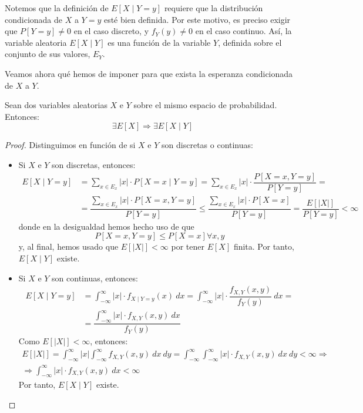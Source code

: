 Notemos que la definición de $E[X\mid Y = y]$ requiere que la distribución condicionada de $X$ a $Y = y$ esté bien definida. Por este motivo, es preciso exigir que $P[Y = y] \neq 0$ en el caso discreto, y $f_Y(y) \neq 0$ en el caso continuo. Así, la variable aleatoria $E[X\mid Y]$ es una función de la variable $Y$, definida sobre el conjunto de sus valores, $E_Y$.

Veamos ahora qué hemos de imponer para que exista la esperanza condicionada de $X$ a $Y$.
\begin{prop}
    Sean dos variables aleatorias $X$ e $Y$ sobre el mismo espacio de probabilidad. Entonces:
    \begin{equation*}
        \exists E[X] \Longrightarrow \exists E[X\mid Y]
    \end{equation*}
\end{prop}
\begin{proof}
    Distinguimos en función de si $X$ e $Y$ son discretas o continuas:
    \begin{itemize}
        \item Si $X$ e $Y$ son discretas, entonces:
        \begin{align*}
            E[X\mid Y=y] &= \sum_{x\in E_x} |x|\cdot P[X = x\mid Y = y] = \sum_{x\in E_x} |x|\cdot \dfrac{P[X = x, Y = y]}{P[Y = y]} =\\&= \dfrac{\sum_{x\in E_x} |x|\cdot P[X = x, Y = y]}{P[Y = y]} \leq \dfrac{\sum_{x\in E_x} |x|\cdot P[X = x]}{P[Y = y]} = \dfrac{E[|X|]}{P[Y = y]}<\infty
        \end{align*}
        donde en la desigualdad hemos hecho uso de que
        \begin{equation*}
            P[X = x, Y = y] \leq P[X = x] \forall x,y
        \end{equation*}
        y, al final, hemos usado que $E[|X|]<\infty$ por tener $E[X]$ finita. Por tanto, $E[X\mid Y]$ existe.

        \item Si $X$ e $Y$ son continuas, entonces:
        \begin{align*}
            E[X\mid Y=y] &= \int_{-\infty}^{\infty} |x|\cdot f_{X\mid Y=y}(x)~dx = \int_{-\infty}^{\infty} |x|\cdot \dfrac{f_{X,Y}(x,y)}{f_Y(y)}~dx =\\&= \dfrac{\int_{-\infty}^{\infty} |x|\cdot f_{X,Y}(x,y)~dx}{f_Y(y)}
        \end{align*}
        Como $E[|X|]<\infty$, entonces:
        \begin{multline*}
            E[|X|]=\int_{-\infty}^{\infty} |x|\int_{-\infty}^{\infty} f_{X,Y}(x,y)~dx~dy = \int_{-\infty}^{\infty} \int_{-\infty}^{\infty} |x|\cdot f_{X,Y}(x,y)~dx~dy<\infty
            \Longrightarrow\\\Longrightarrow
            \int_{-\infty}^{\infty} |x|\cdot f_{X,Y}(x,y)~dx<\infty
        \end{multline*}
        Por tanto, $E[X\mid Y]$ existe.
    \end{itemize}
\end{proof}

